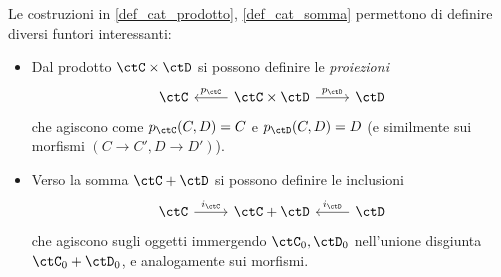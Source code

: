 \begin{example}
	Le costruzioni in \ref{def_cat_prodotto}, \ref{def_cat_somma} permettono di definire diversi funtori interessanti:
	\begin{itemize}
		\item Dal prodotto \(\ctC\times\ctD\) si possono definire le \emph{proiezioni}
		      \[\begin{tikzcd}
				      \ctC & {\ctC\times\ctD} & \ctD
				      \arrow["{p_\ctC}"', from=1-2, to=1-1]
				      \arrow["{p_\ctD}", from=1-2, to=1-3]
			      \end{tikzcd}\]
		      che agiscono come \(p_\ctC(C,D)=C\) e \(p_\ctD(C,D)=D\) (e similmente sui morfismi \((C\to C', D\to D')\)).
		\item Verso la somma \(\ctC+\ctD\) si possono definire le inclusioni
		      \[\begin{tikzcd}
				      \ctC & {\ctC+\ctD} & \ctD
				      \arrow["{i_\ctC}", from=1-1, to=1-2]
				      \arrow["{i_\ctD}"', from=1-3, to=1-2]
			      \end{tikzcd}\]
		      che agiscono sugli oggetti immergendo \(\ctC_0,\ctD_0\) nell'unione disgiunta \(\ctC_0+\ctD_0\), e analogamente sui morfismi.
	\end{itemize}
\end{example}
